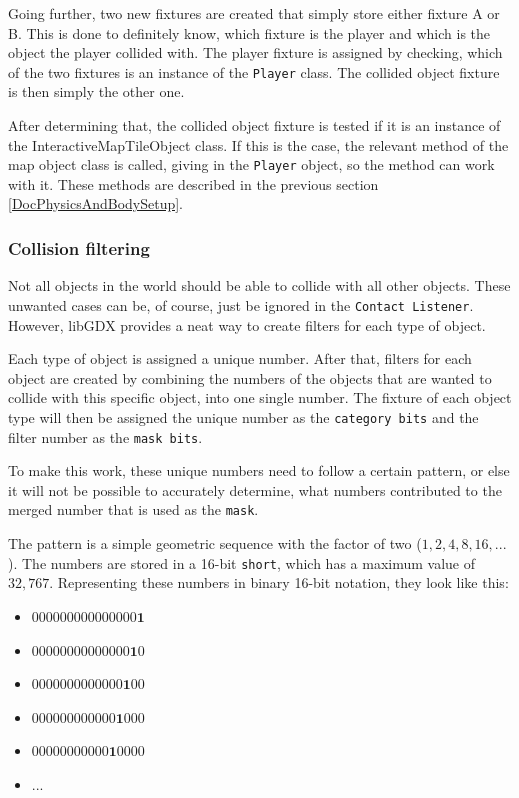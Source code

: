 \documentclass[12p]{article}
\begin{document}
Going further, two new fixtures are created that simply store either fixture A or B. This is done to definitely know, which fixture is the player and which is the object the player collided with. The player fixture is assigned by checking, which of the two fixtures is an instance of the \texttt{Player} class. The collided object fixture is then simply the other one.

After determining that, the collided object fixture is tested if it is an instance of the InteractiveMapTileObject class. If this is the case, the relevant method of the map object class is called, giving in the \texttt{Player} object, so the method can work with it. These methods are described in the previous section \ref{DocPhysicsAndBodySetup}.


\subsubsection{Collision filtering}

Not all objects in the world should be able to collide with all other objects. These unwanted cases can be, of course, just be ignored in the \texttt{Contact Listener}. However, libGDX provides a neat way to create filters for each type of object.

Each type of object is assigned a unique number. After that, filters for each object are created by combining the numbers of the objects that are wanted to collide with this specific object, into one single number. The fixture of each object type will then be assigned the unique number as the \texttt{category bits} and the filter number as the \texttt{mask bits}.

To make this work, these unique numbers need to follow a certain pattern, or else it will not be possible to accurately determine, what numbers contributed to the merged number that is used as the \texttt{mask}.

The pattern is a simple geometric sequence with the factor of two ($1, 2, 4, 8, 16, ...$). The numbers are stored in a 16-bit \texttt{short}, which has a maximum value of $32,767$. Representing these numbers in binary 16-bit notation, they look like this:

\begin{itemize}[leftmargin=*]
    \itemsep-0.75em 
    \item[] $000000000000000\mathbf{1}$
    \item[] $00000000000000\mathbf{1}0$
    \item[] $0000000000000\mathbf{1}00$
    \item[] $000000000000\mathbf{1}000$
    \item[] $00000000000\mathbf{1}0000$
    \item[] $...$
\end{itemize}
\end{document}
